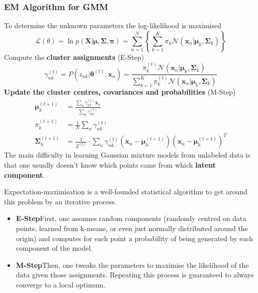 \documentclass[11pt]{article}
\theoremstyle{definition}
\newcommand*\N[1]{\mathcal{N}\left(#1\right)}
\newcommand*\Likelihood{\mathcal{L}}
\begin{document}
\subsubsection{EM Algorithm for GMM}
To determine the unknown parameters the log-likelihood is maximised
\begin{equation*}
	\Likelihood(\theta) = \ln p(\textbf{X}|\bm{\mu}, \bm{\Sigma}, \bm{\pi}) = \sum_{n=1}^{N}\left\{\sum_{k=1}^{K}\pi_k\N{\textbf{x}_n|\bm{\mu}_k, \bm{\Sigma}_k}\right\}
\end{equation*}
Compute the \textbf{cluster assignments} (E-Step)
\begin{equation*}
	\gamma_{nk}^{(t)} = P(z_{nk}|\bm{\theta}^{(t)}, \textbf{x}_n) = \frac{\pi_k^{(t)} \N{\textbf{x}_n|\bm{\mu}_k, \bm{\Sigma}_k}}{\sum_{k=1}^{K}\pi_k^{(t)} \N{\textbf{x}_n|\bm{\mu}_k, \bm{\Sigma}_k}}
\end{equation*}
\textbf{Update the cluster centres, covariances and probabilities} (M-Step)
\begin{align*}
	\bm{\mu}_k^{(t+1)} &= \frac{\sum_{n}\gamma_{nk}^{(t)}\textbf{x}_n}{\sum_{n}\gamma_{nk}^{(t)}}\\
	\pi_k^{(t+1)} &= \frac{1}{N}\sum_n\gamma_{nk}^{(t)}\\
	\bm{\Sigma}_k^{(t+1)} &= \frac{1}{Z^{(t)}} \cdot \sum_n \gamma_{nk}^{(t)} \left(\textbf{x}_n - \bm{\mu}_k^{(t+1)}\right)\left(\textbf{x}_n - \bm{\mu}_k^{(t+1)}\right)^T
\end{align*}
The main difficulty in learning Gaussian mixture models from unlabeled data is that one usually doesn’t know which points came from which \textbf{latent component}.

Expectation-maximisation is a well-founded statistical algorithm to get around this problem by an iterative process.
\begin{itemize}
	\item \textbf{E-Step}\quad First, one assumes random components (randomly centred on data points, learned from k-means, or even just normally distributed around the origin) and computes for each point a probability of being generated by each component of the model.
	\item \textbf{M-Step}\quad Then, one tweaks the parameters to maximise the likelihood of the data given those assignments. Repeating this process is guaranteed to always converge to a local optimum.
\end{itemize}
\end{document}
